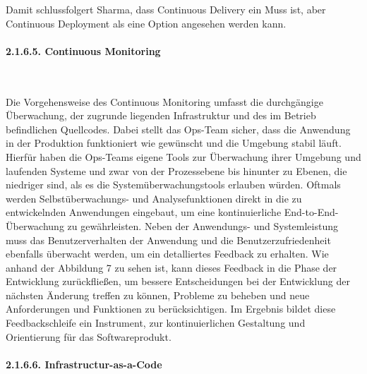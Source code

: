 Damit schlussfolgert Sharma, dass Continuous Delivery ein Muss ist, aber Continuous Deployment als eine Option angesehen werden kann.  

\paragraph{2.1.6.5. Continuous Monitoring} $~$

Die Vorgehensweise des Continuous Monitoring umfasst die durchgängige Überwachung, der zugrunde liegenden Infrastruktur und des im Betrieb befindlichen Quellcodes. \cite{van_hoorn_continuous_2012} Dabei stellt das Ops-Team sicher, dass die Anwendung in der Produktion funktioniert wie gewünscht und die Umgebung stabil läuft. Hierfür haben die Ops-Teams eigene Tools zur Überwachung ihrer Umgebung und laufenden Systeme und zwar von der Prozessebene bis hinunter zu Ebenen, die niedriger sind, als es die Systemüberwachungstools erlauben würden. \cite[S. 26]{sharma_devops_2017} Oftmals werden Selbstüberwachungs- und Analysefunktionen direkt in die zu entwickelnden Anwendungen eingebaut, um eine kontinuierliche End-to-End-Überwachung zu gewährleisten. \cite[S. 26]{sharma_devops_2017} Neben der Anwendungs- und Systemleistung muss das Benutzerverhalten der Anwendung und die Benutzerzufriedenheit ebenfalls überwacht werden, um ein detalliertes Feedback zu erhalten. \cite[S. 112 - 113]{erder_continuous_2016} Wie anhand der Abbildung 7 zu sehen ist, kann dieses Feedback in die Phase der Entwicklung zurückfließen, um bessere Entscheidungen bei der Entwicklung der nächsten Änderung treffen zu können, Probleme zu beheben und neue Anforderungen und Funktionen zu berücksichtigen. Im Ergebnis bildet diese Feedbackschleife ein Instrument, zur kontinuierlichen Gestaltung und Orientierung für das Softwareprodukt.   

\paragraph{2.1.6.6. Infrastructur-as-a-Code} $~$

